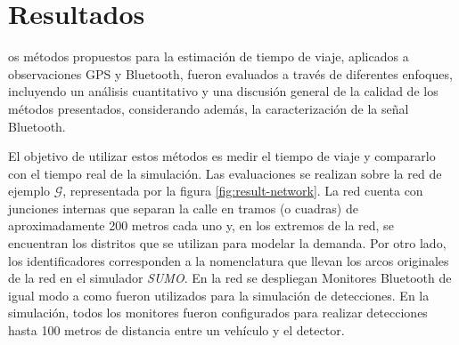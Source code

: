 \let\textcircled=\pgftextcircled
\chapter {Resultados}
\label{chap:resultados}

os métodos propuestos para la estimación de tiempo de viaje, aplicados a observaciones GPS y Bluetooth, fueron evaluados a través de diferentes enfoques, incluyendo un análisis cuantitativo y una discusión general de la calidad de los métodos presentados, considerando además, la caracterización de la señal Bluetooth.

El objetivo de utilizar estos métodos es medir el tiempo de viaje y compararlo con el tiempo real de la simulación. Las evaluaciones se realizan sobre la red de ejemplo \(\mathcal{G}\), representada por la figura \ref{fig:result-network}. La red cuenta con junciones internas que separan la calle en tramos (o cuadras) de aproximadamente 200 metros cada uno y, en los extremos de la red, se encuentran los distritos que se utilizan para modelar la demanda. Por otro lado, los identificadores corresponden a la nomenclatura que llevan los arcos originales de la red en el simulador \textit{SUMO}. En la red se despliegan Monitores Bluetooth de igual modo a como fueron utilizados para la simulación de detecciones. En la simulación, todos los monitores fueron configurados para  realizar detecciones hasta 100 metros de distancia entre un vehículo y el detector.

